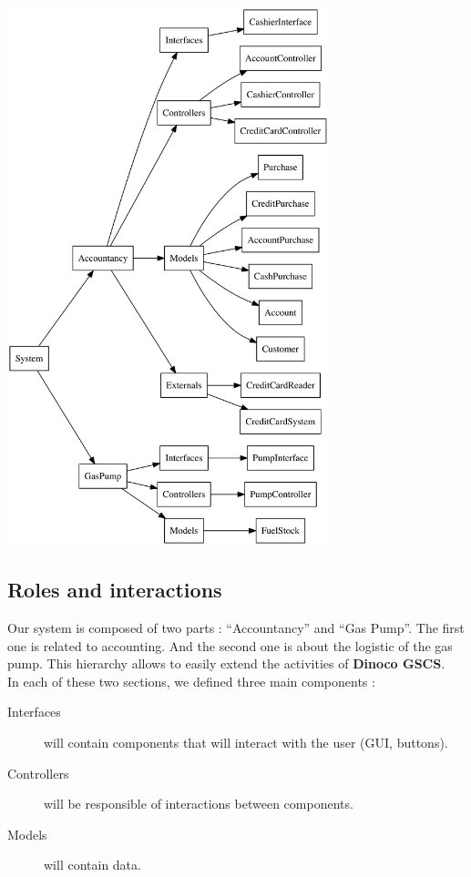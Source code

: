 \documentclass[11pt, a4paper]{article}
\begin{document}
\begin{center}
\centerline{\includegraphics[width=0.7\textwidth]{hierarchical.png}}
\end{center}

\subsection{Roles and interactions}

Our system is composed of two parts : ``Accountancy'' and ``Gas Pump''. The first one is related to accounting. And the second one is about the logistic of the gas pump. This hierarchy allows to easily extend the activities of \textbf{Dinoco GSCS}.\\


In each of these two sections, we defined three main components : 
\begin{description}
\item[Interfaces] will contain components that will interact with the user (GUI, buttons).
\item[Controllers] will be responsible of interactions between components.
\item[Models] will contain data.
\end{description}
\end{document}
